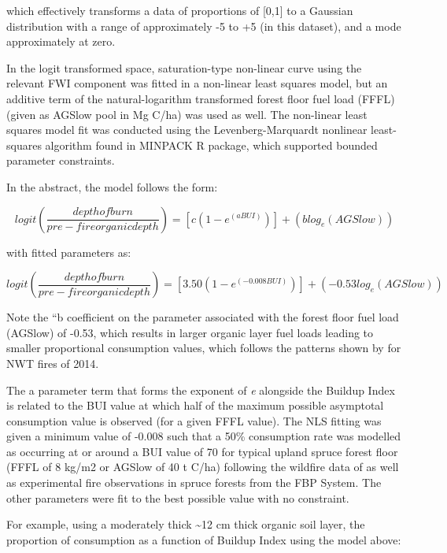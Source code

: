 \documentclass[, manuscript]{copernicus}
\begin{document}
which effectively transforms a data of proportions of {[}0,1{]} to a
Gaussian distribution with a range of approximately -5 to +5 (in this
dataset), and a mode approximately at zero.

In the logit transformed space, saturation-type non-linear curve using
the relevant FWI component was fitted in a non-linear least squares
model, but an additive term of the natural-logarithm transformed forest
floor fuel load (FFFL) (given as AGSlow pool in Mg C/ha) was used as
well. The non-linear least squares model fit was conducted using the
Levenberg-Marquardt nonlinear least-squares algorithm found in MINPACK
\citep{elzhovMinpacklmInterfaceLevenbergMarquardt2023} R package, which
supported bounded parameter constraints.

In the abstract, the model follows the form:

\begin{equation}
logit \left( \frac{depth of burn}{pre-fire organic depth}\right) = [c (1 - e^{(a  BUI)})] + (b log_{e}(AGSlow))
\end{equation}

with fitted parameters as:

\begin{equation}
logit \left( \frac{depth of burn}{pre-fire organic depth}\right) = [3.50 (1 - e^{(-0.008 BUI)})] + (-0.53 log_{e}(AGSlow))
\end{equation}

Note the ``b coefficient on the parameter associated with the forest
floor fuel load (AGSlow) of -0.53, which results in larger organic layer
fuel loads leading to smaller proportional consumption values, which
follows the patterns shown by \citet{walkerCrossscaleControlsCarbon2018}
for NWT fires of 2014.

The a parameter term that forms the exponent of \emph{e} alongside the
Buildup Index is related to the BUI value at which half of the maximum
possible asymptotal consumption value is observed (for a given FFFL
value). The NLS fitting was given a minimum value of -0.008 such that a
50\% consumption rate was modelled as occurring at or around a BUI value
of 70 for typical upland spruce forest floor (FFFL of 8 kg/m2 or AGSlow
of 40 t C/ha) following the wildfire data of \citet{degroot2009} as well
as experimental fire observations in spruce forests from the FBP System.
The other parameters were fit to the best possible value with no
constraint.

For example, using a moderately thick \textasciitilde12 cm thick organic
soil layer, the proportion of consumption as a function of Buildup Index
using the model above:
\end{document}
